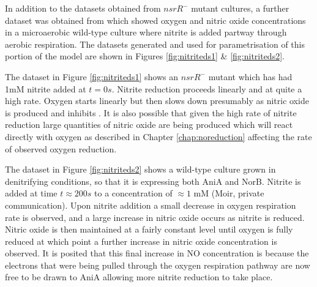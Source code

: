 In addition to the datasets obtained from $nsrR^-$ mutant cultures, a further dataset was obtained from \citet{Rock2005} which showed oxygen and nitric oxide concentrations in a microaerobic wild-type culture where nitrite is added partway through aerobic respiration. The datasets generated and used for parametrisation of this portion of the model are shown in Figures \ref{fig:nitriteds1} \& \ref{fig:nitriteds2}.

The dataset in Figure \ref{fig:nitriteds1} shows an $nsrR^-$ mutant which has had 1mM nitrite added at $t=0s$. Nitrite reduction proceeds linearly and at quite a high rate. Oxygen starts linearly but then slows down presumably as nitric oxide is produced and inhibits \cbbthree{}. It is also possible that given the high rate of nitrite reduction large quantities of nitric oxide are being produced which will react directly with oxygen as described in Chapter \ref{chap:noreduction} affecting the rate of observed oxygen reduction.

The dataset in Figure \ref{fig:nitriteds2} shows a wild-type culture grown in denitrifying conditions, so that it is expressing both AniA and NorB. Nitrite is added at time $t\approx200s$ to a concentration of $\approx 1$ mM (Moir, private communication). Upon nitrite addition a small decrease in oxygen respiration rate is observed, and a large increase in nitric oxide occurs as nitrite is reduced. Nitric oxide is then maintained at a fairly constant level until oxygen is fully reduced at which point a further increase in nitric oxide concentration is observed. It is posited that this final increase in NO concentration is because the electrons that were being pulled through the oxygen respiration pathway are now free to be drawn to AniA allowing more nitrite reduction to take place.

